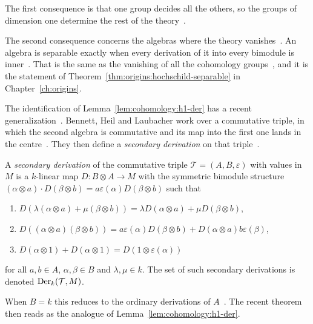 The first consequence is that one group decides all the others, so the groups
of dimension one determine the rest of the
theory~\cite[Theorem~3.1, p.~60]{Hochschild1945}.

The second consequence concerns the algebras where the theory
vanishes~\cite[p.~58 and \S~4]{Hochschild1945}. An algebra is separable
exactly when every derivation of it into every bimodule is inner~\cite[p.~58
and \S~4]{Hochschild1945}. That is the same as the vanishing of all the
cohomology groups~\cite[p.~58 and \S~4]{Hochschild1945}, and it is the
statement of Theorem~\ref{thm:origins:hochschild-separable} in
Chapter~\ref{ch:origins}.

The identification of Lemma~\ref{lem:cohomology:h1-der} has a recent
generalization~\cite[Definition~2.1, p.~1]{BennettHeilLaubacher2023}. Bennett,
Heil and Laubacher work over a commutative triple, in which the second algebra
is commutative and its map into the first one lands in the
centre~\cite[Definition~2.1, p.~1]{BennettHeilLaubacher2023}. They then define
a \emph{secondary derivation} on that
triple~\cite[Definition~3.1, p.~5]{BennettHeilLaubacher2023}.

\begin{definition}\label{def:cohomology:secondary}
A \emph{secondary derivation} of the commutative triple
$\mathcal{T} = (A, B, \varepsilon)$ with values in $M$ is a $k$-linear map
$D\colon B\otimes A \to M$ with the symmetric bimodule structure
$(\alpha\otimes a)\cdot D(\beta\otimes b) = a\varepsilon(\alpha)D(\beta\otimes b)$
such that
\begin{enumerate}
\item $D(\lambda(\alpha\otimes a) + \mu(\beta\otimes b)) = \lambda D(\alpha\otimes a) + \mu D(\beta\otimes b)$,
\item $D((\alpha\otimes a)(\beta\otimes b)) = a\varepsilon(\alpha)D(\beta\otimes b) + D(\alpha\otimes a)b\varepsilon(\beta)$,
\item $D(\alpha\otimes 1) + D(\alpha\otimes 1) = D(1\otimes\varepsilon(\alpha))$
\end{enumerate}
for all $a, b\in A$, $\alpha, \beta\in B$ and $\lambda, \mu\in k$. The set of
such secondary derivations is denoted $\operatorname{Der}_k(\mathcal{T}, M)$.
\end{definition}

When $B = k$ this reduces to the ordinary derivations of
$A$~\cite[Remark~3.3, p.~5]{BennettHeilLaubacher2023}. The recent theorem then
reads as the analogue of Lemma~\ref{lem:cohomology:h1-der}.


